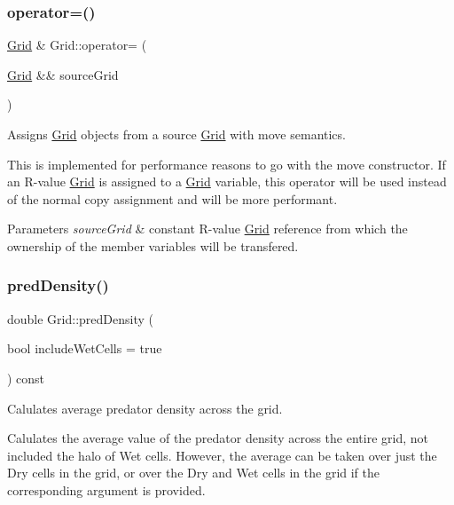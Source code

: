 \subsubsection{\texorpdfstring{operator=()}{operator=()}\hspace{0.1cm}{\footnotesize\ttfamily [2/2]}}
{\footnotesize\ttfamily \hyperlink{class_grid}{Grid} \& Grid\+::operator= (\begin{DoxyParamCaption}\item[{\hyperlink{class_grid}{Grid} \&\&}]{source\+Grid }\end{DoxyParamCaption})}



Assigns \hyperlink{class_grid}{Grid} objects from a source \hyperlink{class_grid}{Grid} with move semantics. 

This is implemented for performance reasons to go with the move constructor. If an R-\/value \hyperlink{class_grid}{Grid} is assigned to a \hyperlink{class_grid}{Grid} variable, this operator will be used instead of the normal copy assignment and will be more performant.


\begin{DoxyParams}{Parameters}
{\em source\+Grid} & constant R-\/value \hyperlink{class_grid}{Grid} reference from which the ownership of the member variables will be transfered. \\
\hline
\end{DoxyParams}
\mbox{\label{class_grid_a25eeb1fef1d86fe74b45e615f0376158}} 
\subsubsection{\texorpdfstring{pred\+Density()}{predDensity()}}
{\footnotesize\ttfamily double Grid\+::pred\+Density (\begin{DoxyParamCaption}\item[{bool}]{include\+Wet\+Cells = {\ttfamily true} }\end{DoxyParamCaption}) const}



Calulates average predator density across the grid. 

Calulates the average value of the predator density across the entire grid, not included the halo of Wet cells. However, the average can be taken over just the Dry cells in the grid, or over the Dry and Wet cells in the grid if the corresponding argument is provided.


